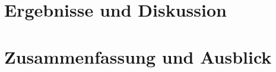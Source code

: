 \documentclass[%
	BCOR12mm, %
	cleardoublepage=empty, %
	tablecaptionabove, %
	toc=bib, %
	toc=listofnumbered, %
	listof=leveldown, %
	numbers=noendperiod %
	]{scrbook}
\renewcommand\appendix{\par
	\addchap{\appendixname}
	\setcounter{section}{0}%
	\setcounter{subsection}{0}%
	\setcounter{figure}{0}%
	\renewcommand\thesection{\Alph{section}}%
	\renewcommand\thefigure{\Alph{section}.\arabic{figure}} 
	\renewcommand\thetable{\Alph{section}.\arabic{table}}}
\begin{document}

\chapter{Ergebnisse und Diskussion} %
\label{cha:ergebnisse_und_diskussion}


\chapter{Zusammenfassung und Ausblick} %
\label{cha:zusammenfassung_und_ausblick}





\appendix

\listoffigures

\listoftables
\end{document}

